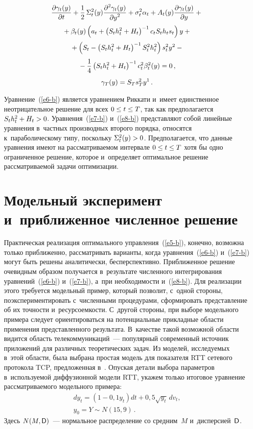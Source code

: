 \begin{multicols}{2}
\vspace*{-12pt}

\begin{multline}
\displaystyle\frac{\displaystyle \partial \gamma_t(y)\mathstrut}{\displaystyle \partial  t\mathstrut}+\displaystyle\frac{\displaystyle 1\mathstrut}{\displaystyle 2\mathstrut}\,\Sigma_t^2(y)\displaystyle\frac{\displaystyle \partial^2 
\gamma_t(y)\mathstrut}{\displaystyle \partial y^2\mathstrut} +\sigma^2_t \alpha_t +A_t(y) \displaystyle\frac{\displaystyle \partial \gamma_t(y)\mathstrut}{\displaystyle \partial 
y\mathstrut}+{}\\[2pt]
{}+ \beta_t(y)\left( a_t+\left( S_t h_t^2+H_t\right)^{-1} c_t S_t h_t s_t\right) 
y+{}\\[2pt]
{}+\left( S_t- \left( S_t h_t^2 +H_t\right)^{-1} S_t^2 h_t^2\right) s_t^2 y^2-{}\\[2pt]
{}-\displaystyle\frac{\displaystyle 1\mathstrut}{\displaystyle 4\mathstrut}\left( S_t h_t^2 +H_t\right)^{-1} c_t^2 \beta_t^2(y)=0\,,\\[2pt] 
\gamma_T(y)=S_T s_T^2 y^1\,.
\label{e8-b}
\end{multline}
     
     Уравнение~(\ref{e6-b}) является уравнением Риккати и~имеет 
единственное неотрицательное решение для всех $0\hm\leq t\hm\leq T$, так 
как предполагается $S_t h_t^2\hm+ H_t\hm>0$. 
Уравнения~(\ref{e7-b}) 
и~(\ref{e8-b}) представляют собой линейные уравнения в~частных 
производных второго порядка, относятся к~параболическому типу, поскольку 
$\Sigma_t^2(y)\hm>0$. Предполагается, что данные уравнения имеют 
на рассматриваемом интервале $0\hm\leq t\hm\leq T$ хотя бы одно 
ограниченное решение, которое и~определяет оптимальное решение 
рассматриваемой задачи оптимизации.
 

\section{Модельный эксперимент и~приближенное численное 
решение}
     
     Практическая реализация оптимального управ\-ле\-ния~(\ref{e5-b}), 
конечно, возможна только приближенно, рассматривать варианты, когда 
уравнения~(\ref{e6-b}) и~(\ref{e7-b}) могут быть решены аналитически, 
бесперспективно. Приближенное решение очевидным образом получается 
в~результате численного интегрирования уравнений~(\ref{e6-b})  
и~(\ref{e7-b}), а~при не\-об\-хо\-ди\-мости и~(\ref{e8-b}). Для реализации этого 
требуется модельный пример, который позволит, с~одной стороны, 
поэкспериментировать с~численными процедурами, сформировать 
представление об их точности и~ресурсоемкости. С~другой стороны, при 
выборе модельного примера следует ориентироваться на потенциальные 
прикладные области применения представленного результата. В~качестве 
такой возможной области видится область телекоммуникаций~--- 
популярный современный источник приложений для различных 
теоретических задач. Из моделей, исследуемых в~этой области, была выбрана 
простая модель для показателя RTT сетевого протокола 
TCP, предложенная в~\cite{3-b}. Опуская 
детали выбора параметров в~используемой диффузионной модели RTT, 
укажем только итоговое уравнение рассматриваемого модельного примера:
     \begin{multline}
     dy_t= \left( 1-0{,}1y_t\right) dt+0{,}5\sqrt{y_t}\,dv_t,\\ y_0=Y\sim 
N(15,9)\,.
     \label{e9-b}
     \end{multline}
Здесь $N(M,{\sf D})$~--- нормальное распределение со средним~$M$ 
и~дисперсией~${\sf D}$.
     

\end{multicols}
